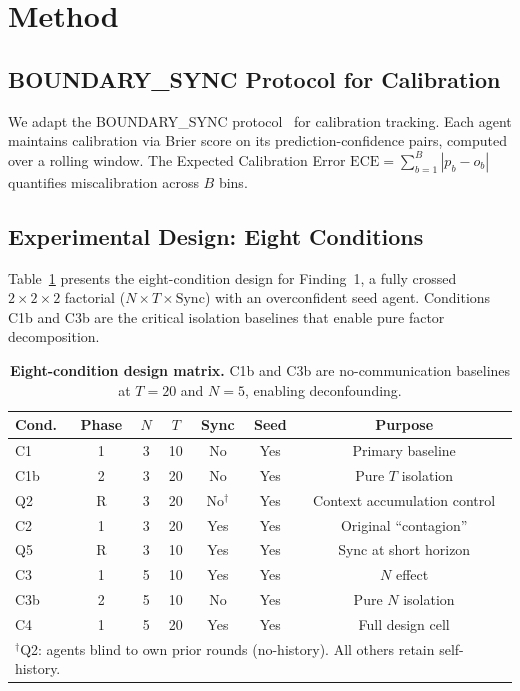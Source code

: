\documentclass[11pt]{article}
\newcommand{\ECE}{\ensuremath{\mathrm{ECE}}}
\theoremstyle{definition}
\theoremstyle{remark}
\begin{document}
\section{Method}

\subsection{BOUNDARY\_SYNC Protocol for Calibration}

We adapt the BOUNDARY\_SYNC protocol~\citep{boundarysync2026} for calibration tracking. Each agent maintains calibration via Brier score on its prediction-confidence pairs, computed over a rolling window. The Expected Calibration Error $\ECE = \sum_{b=1}^{B} |p_b - o_b|$ quantifies miscalibration across $B$ bins.

\subsection{Experimental Design: Eight Conditions}

Table~\ref{tab:design} presents the eight-condition design for Finding~1, a fully crossed $2 \times 2 \times 2$ factorial ($N \times T \times \text{Sync}$) with an overconfident seed agent. Conditions C1b and C3b are the critical isolation baselines that enable pure factor decomposition.

\begin{table}[H]
\centering
\caption{\textbf{Eight-condition design matrix.} C1b and C3b are no-communication baselines at $T{=}20$ and $N{=}5$, enabling deconfounding.}
\label{tab:design}
\begin{tabular}{@{}lcccccc@{}}
\toprule
Cond. & Phase & $N$ & $T$ & Sync & Seed & Purpose \\
\midrule
C1  & 1 & 3 & 10 & No  & Yes & Primary baseline \\
C1b & 2 & 3 & 20 & No  & Yes & Pure $T$ isolation \\
Q2  & R & 3 & 20 & No$^\dagger$ & Yes & Context accumulation control \\
C2  & 1 & 3 & 20 & Yes & Yes & Original ``contagion'' \\
Q5  & R & 3 & 10 & Yes & Yes & Sync at short horizon \\
C3  & 1 & 5 & 10 & Yes & Yes & $N$ effect \\
C3b & 2 & 5 & 10 & No  & Yes & Pure $N$ isolation \\
C4  & 1 & 5 & 20 & Yes & Yes & Full design cell \\
\bottomrule
\multicolumn{7}{l}{\footnotesize $^\dagger$Q2: agents blind to own prior rounds (no-history). All others retain self-history.} \\
\end{tabular}
\end{table}
\end{document}
